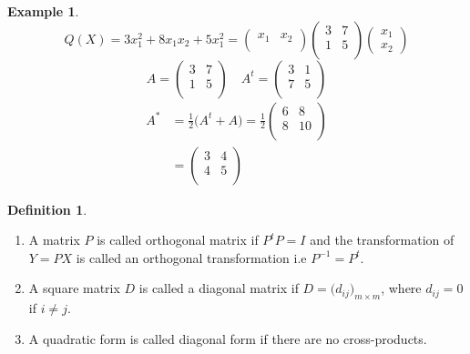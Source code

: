 \documentclass[11pt,a4paper]{article}
\theoremstyle{definition}
\newtheorem{defn}[thm]{Definition}
\newtheorem{exa}[thm]{Example}
\begin{document}
\begin{exa}
$$Q(X)=3x^2_1+8x_1x_2+5x^2_1=
\begin{pmatrix}
x_1& x_2\\
\end{pmatrix}
\begin{pmatrix}
3&7\\
1&5\\
\end{pmatrix}
\begin{pmatrix}
x_1\\
x_2
\end{pmatrix}
$$
$$
A=
\begin{pmatrix}
3 & 7\\
1 & 5\\
\end{pmatrix}
\quad 
A^t=
\begin{pmatrix}
3 & 1\\
7 & 5\\
\end{pmatrix}
$$
\begin{align*}
A^* & =\frac{1}{2}\big(A^t+A\big)
= 
\frac{1}{2}
\begin{pmatrix}
6 & 8\\
8 & 10\\
\end{pmatrix}\\ 
& = 
\begin{pmatrix}
3 & 4\\
4 & 5\\
\end{pmatrix}
\end{align*}
\end{exa}


\begin{defn}\label{res:defn:1.1.6}
\begin{enumerate}
\item[i.] A matrix $P$ is called orthogonal matrix if $P^tP=I$ and the transformation of $Y=PX$ is called an orthogonal transformation i.e $P^{-1}=P^t$.
\item[ii.] A square matrix $D$ is called a diagonal matrix if $D=\big(d_{ij}\big)_{m\times m}$, where $d_{ij}=0$ if $i\neq j$.
\item[iii.] A quadratic form is called diagonal form if there are no cross-products.\\
\end{enumerate}
\end{defn}
\end{document}
